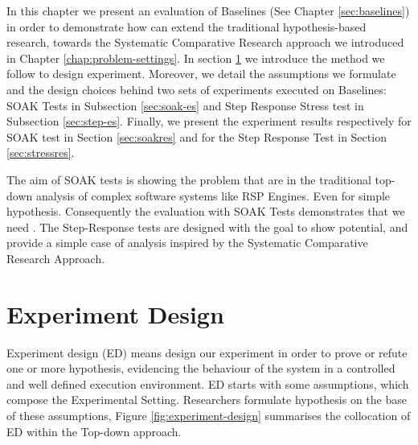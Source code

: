 

In this chapter we present an evaluation of \name Baselines (See Chapter \ref{sec:baselines}) in order to demonstrate how \name can extend the traditional hypothesis-based research, towards the Systematic Comparative Research approach we introduced in Chapter \ref{chap:problem-settings}. In section \ref{sec:experiment-design} we introduce the method we follow to design experiment. Moreover, we detail the assumptions we formulate and the design choices behind two sets of experiments executed on \name Baselines: SOAK Tests in Subsection \ref{sec:soak-es} and Step Response Stress test in Subsection \ref{sec:step-es}. Finally, we present the experiment results respectively for SOAK test in Section \ref{sec:soakres} and for the Step Response Test in Section \ref{sec:stressres}.

The aim of SOAK tests is showing the problem that are in the traditional top-down analysis of complex software systems like RSP Engines. Even for simple hypothesis. Consequently the evaluation with SOAK Tests demonstrates that we need \namens. The Step-Response tests are designed with the goal to show \name potential, and provide a simple case of analysis inspired by the Systematic Comparative Research Approach.

\section{Experiment Design}\label{sec:experiment-design}

Experiment design (ED) means design our experiment in order to prove or refute one or more hypothesis, evidencing the behaviour of the system in a controlled and well defined execution environment. ED starts with some assumptions, which compose the  Experimental Setting. Researchers formulate hypothesis on the base of these assumptions, Figure \ref{fig:experiment-design} summarises the collocation of ED within the Top-down approach.

